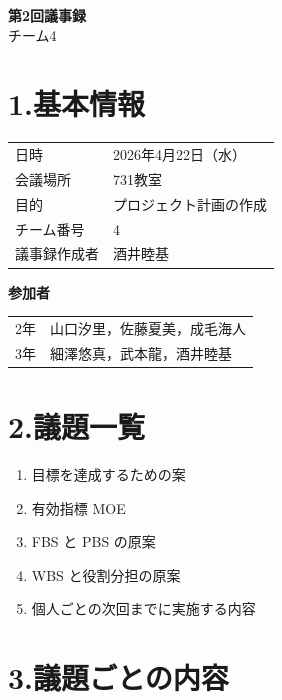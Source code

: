 \documentclass[a4paper,12pt]{ltjsarticle}
\begin{document}
\begin{center}
  {\Large \textbf{第2回議事録}}\\[8pt]
  {\large チーム4}
\end{center}

\vspace{4mm}

\section*{1.基本情報}
\begin{tabular}{ll}
  \toprule
  日時     & 2026年4月22日（水） \\
  会議場所 & 731教室 \\
  目的     & プロジェクト計画の作成 \\
  チーム番号 & 4 \\
  議事録作成者 & 酒井睦基 \\
  \bottomrule
\end{tabular}

\vspace{4mm}
\noindent\textbf{参加者}

\begin{tabular}{ll}
  2年 & 山口汐里，佐藤夏美，成毛海人 \\
  3年 & 細澤悠真，武本龍，酒井睦基 \\
\end{tabular}

\section*{2.議題一覧}
\begin{enumerate}[label=議題\arabic*：]
  \item 目標を達成するための案
  \item 有効指標 MOE
  \item FBS と PBS の原案
  \item WBS と役割分担の原案
  \item 個人ごとの次回までに実施する内容
\end{enumerate}

\section*{3.議題ごとの内容}
\end{document}
